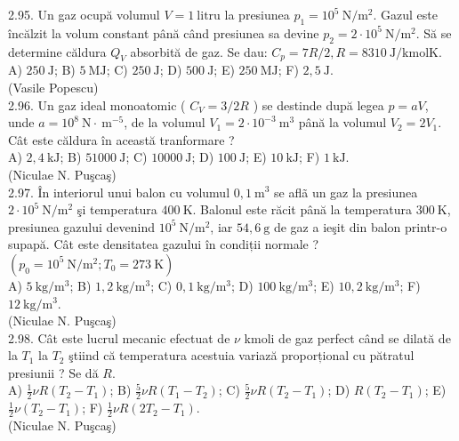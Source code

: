 2.95. Un gaz ocupă volumul $V=1 \mathrm{~litru}$ la presiunea $p_{1}=10^{5} \mathrm{~N} / \mathrm{m}^{2}$. Gazul este încălzit la volum constant până când presiunea sa devine $p_{2}=2 \cdot 10^{5} \mathrm{~N} / \mathrm{m}^{2}$. Să se determine căldura $Q_{V}$ absorbită de gaz. Se dau: $C_{p}=7 R / 2, R=8310 \mathrm{~J} / \mathrm{kmol} \mathrm{K}$.\\ A) $250 \mathrm{~J}$; B) $5 \mathrm{~MJ}$; C) $250 \mathrm{~J}$; D) $500 \mathrm{~J}$; E) $250 \mathrm{~MJ}$; F) $2,5 \mathrm{~J}$.\\ (Vasile Popescu)\\

2.96. Un gaz ideal monoatomic ( $C_{V}=3 / 2 R$ ) se destinde după legea $p=a V$, unde $a=10^{8} \mathrm{~N} \cdot \mathrm{~m}^{-5}$, de la volumul $V_{1}=2 \cdot 10^{-3} \mathrm{~m}^{3}$ până la volumul $V_{2}=2 V_{1}$. Cât este căldura în această tranformare ?\\ A) $2,4 \mathrm{~kJ}$; B) $51000 \mathrm{~J}$; C) $10000 \mathrm{~J}$; D) $100 \mathrm{~J}$; E) $10 \mathrm{~kJ}$; F) $1 \mathrm{~kJ}$.\\ (Niculae N. Puşcaş)\\

2.97. În interiorul unui balon cu volumul $0,1 \mathrm{~m}^{3}$ se aflã un gaz la presiunea $2 \cdot 10^{5} \mathrm{~N} / \mathrm{m}^{2}$ şi temperatura $400 \mathrm{~K}$. Balonul este răcit până la temperatura $300 \mathrm{~K}$, presiunea gazului devenind $10^{5} \mathrm{~N} / \mathrm{m}^{2}$, iar $54,6 \mathrm{~g}$ de gaz a ieşit din balon printr-o supapă. Cât este densitatea gazului în condiții normale ? $\left(p_{0}=10^{5} \mathrm{~N} / \mathrm{m}^{2} ; T_{0}=273 \mathrm{~K}\right)$\\ A) $5 \mathrm{~kg} / \mathrm{m}^{3}$; B) $1,2 \mathrm{~kg} / \mathrm{m}^{3}$; C) $0,1 \mathrm{~kg} / \mathrm{m}^{3}$; D) $100 \mathrm{~kg} / \mathrm{m}^{3}$; E) $10,2 \mathrm{~kg} / \mathrm{m}^{3}$; F) $12 \mathrm{~kg} / \mathrm{m}^{3}$.\\ (Niculae N. Puşcaş)\\

2.98. Cât este lucrul mecanic efectuat de $\nu$ kmoli de gaz perfect când se dilată de la $T_{1}$ la $T_{2}$ ştiind că temperatura acestuia variază proporțional cu pătratul presiunii ? Se dă $R$.\\ A) $\frac{1}{2} \nu R\left(T_{2}-T_{1}\right)$; B) $\frac{5}{2} \nu R\left(T_{1}-T_{2}\right)$; C) $\frac{5}{2} \nu R\left(T_{2}-T_{1}\right)$; D) $R\left(T_{2}-T_{1}\right)$; E) $\frac{1}{2} \nu\left(T_{2}-T_{1}\right)$; F) $\frac{1}{2} \nu R\left(2 T_{2}-T_{1}\right)$.\\ (Niculae N. Puşcaş)\\

